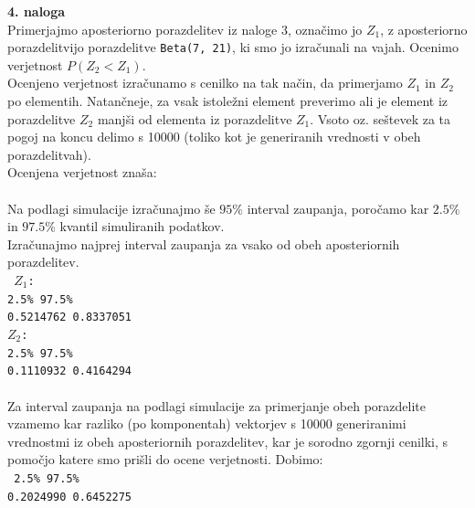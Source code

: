 \documentclass[a4paper,11pt]{article}
\begin{document}
\noindent
\textbf{4. naloga}
\\
Primerjajmo aposteriorno porazdelitev iz naloge 3, označimo jo $Z_1$, z aposteriorno porazdelitvijo porazdelitve \texttt{Beta(7, 21)}, ki smo jo izračunali na vajah.
Ocenimo verjetnost $P(Z_2 < Z_1)$.
\\
Ocenjeno verjetnost izračunamo s cenilko na tak način, da primerjamo $Z_1$ in $Z_2$ po elementih. Natančneje, za vsak istoležni element preverimo ali je element iz porazdelitve $Z_2$ manjši od elementa iz porazdelitve $Z_1$. 
Vsoto oz. seštevek za ta pogoj na koncu delimo s 10000 (toliko kot je generiranih vrednosti v obeh porazdelitvah). 
\\
Ocenjena verjetnost znaša: 
\\
\\
Na podlagi simulacije izračunajmo še $95\%$ interval zaupanja, poročamo kar $2.5\%$ in $97.5\%$ kvantil simuliranih podatkov.
\\
Izračunajmo najprej interval zaupanja za vsako od obeh aposteriornih porazdelitev.
\\
\texttt{
$Z_1$: 
\\
2.5\%     97.5\% 
\\
0.5214762 0.8337051 
\\
$Z_2$: 
\\
2.5\%     97.5\% 
\\
0.1110932 0.4164294 
}
\\
\\
Za interval zaupanja na podlagi simulacije za primerjanje obeh porazdelite vzamemo kar razliko (po komponentah) vektorjev s 10000 generiranimi vrednostmi iz obeh aposteriornih porazdelitev,
kar je sorodno zgornji cenilki, s pomočjo katere smo prišli do ocene verjetnosti.
Dobimo: 
\\
\texttt{
2.5\%     97.5\% 
\\
0.2024990 0.6452275 
}
\end{document}
